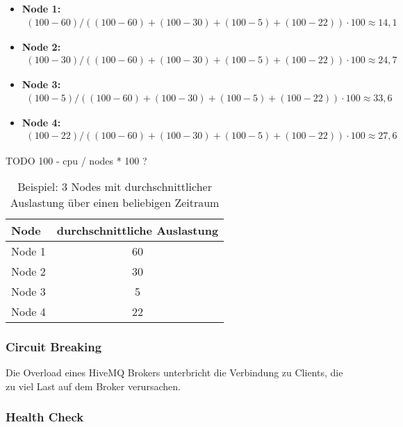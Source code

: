 \begin{itemize}
  \item \textbf{Node 1:}
    \begin{align}
      (100 - 60) / ((100 - 60) + (100 - 30) + (100 - 5) + (100 - 22)) \cdot 100 \approx 14,1
    \end{align}
  \item \textbf{Node 2:}
    \begin{align}
      (100 - 30) / ((100 - 60) + (100 - 30) + (100 - 5) + (100 - 22)) \cdot 100 \approx 24,7
    \end{align}
  \item \textbf{Node 3:}
    \begin{align}
      (100 - 5) / ((100 - 60) + (100 - 30) + (100 - 5) + (100 - 22)) \cdot 100 \approx 33,6
    \end{align}
  \item \textbf{Node 4:}
    \begin{align}
      (100 - 22) / ((100 - 60) + (100 - 30) + (100 - 5) + (100 - 22)) \cdot 100 \approx 27,6
    \end{align}
\end{itemize}

TODO
100 - cpu / nodes * 100 ?

\begin{table}[h!]
\centering
\renewcommand{\arraystretch}{1.5}
\begin{tabular}{|l|c|}
    \hline
    \textbf{Node} & \textbf{durchschnittliche Auslastung} \\
    \hline
    \hline
    Node 1 & 60 \\
    \hline
    Node 2 & 30 \\
    \hline
    Node 3 & 5 \\
    \hline
    Node 4 & 22 \\
    \hline
\end{tabular}
\caption{Beispiel: 3 Nodes mit durchschnittlicher Auslastung über einen beliebigen Zeitraum}
\label{table:example-cluster-cpu}
\end{table}

\subsubsection{Circuit Breaking}
Die Overload eines HiveMQ Brokers unterbricht die Verbindung zu Clients, die zu viel Last auf dem Broker verursachen.

\subsubsection{Health Check}

